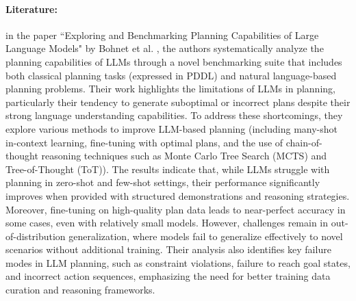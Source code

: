 \paragraph{Literature:}
in the paper ``Exploring and Benchmarking Planning Capabilities of Large
Language Models" by Bohnet et al.
\cite{bohnet2024exploringbenchmarkingplanningcapabilities}, the authors systematically
analyze the planning capabilities of LLMs through a novel benchmarking suite that
includes both classical planning tasks (expressed in PDDL) and natural language-based
planning problems. Their work highlights the limitations of LLMs in planning, particularly
their tendency to generate suboptimal or incorrect plans despite their strong language
understanding capabilities. To address these shortcomings, they explore various methods
to improve LLM-based planning (including many-shot in-context learning, fine-tuning
with optimal plans, and the use of chain-of-thought reasoning techniques such as
Monte Carlo Tree Search (MCTS) and Tree-of-Thought (ToT)). The results indicate
that, while LLMs struggle with planning in zero-shot and few-shot settings,
their performance significantly improves when provided with structured
demonstrations and reasoning strategies. Moreover, fine-tuning on high-quality
plan data leads to near-perfect accuracy in some cases, even with relatively small
models. However, challenges remain in out-of-distribution generalization, where
models fail to generalize effectively to novel scenarios without additional
training. Their analysis also identifies key failure modes in LLM planning, such
as constraint violations, failure to reach goal states, and incorrect action
sequences, emphasizing the need for better training data curation and reasoning frameworks.

